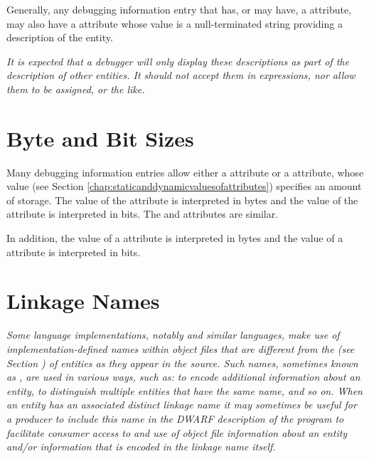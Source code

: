 Generally, any debugging information
entry that 
\hypertarget{chap:DWATdescriptionartificialnameordescription}{}
has, or may have, 
a 
\DWATname{} attribute, may
also have 
a 
\DWATdescription{} attribute whose value is a
null-terminated string providing a description of the entity.


\textit{It is expected that a debugger will only display these
descriptions as part of the description of other entities. It
should not accept them in expressions, nor allow them to be
assigned, or the like.}

\section{Byte and Bit Sizes}
\label{chap:byteandbitsizes}
Many debugging information entries allow either a
\DWATbytesize{} attribute or a 
\DWATbitsize{} attribute,
whose  value 
(see Section \ref{chap:staticanddynamicvaluesofattributes}) 
specifies an
amount of storage. The value of the 
\DWATbytesize{} attribute
is interpreted in bytes and the value of the 
\DWATbitsize{}
attribute is interpreted in bits. The
\DWATstringlengthbytesize{} and 
\DWATstringlengthbitsize{} 
attributes are similar.

In addition, the 
value of a \DWATbytestride{} attribute is interpreted
in bytes and the  value of a 
\DWATbitstride{}
attribute is interpreted in bits.

\section{Linkage Names}
\label{chap:linkagenames}
\textit{Some language implementations, notably 
 and similar
languages, make use of implementation-defined names within
object files that are different from the 
(see Section ) of entities as they 
appear in the source. Such names, sometimes known as 
,
are used in various ways, such as: to encode additional
information about an entity, to distinguish multiple entities
that have the same name, and so on. When an entity has an
associated distinct linkage name it may sometimes be useful
for a producer to include this name in the DWARF description
of the program to facilitate consumer access to and use of
object file information about an entity and/or information
\hypertarget{chap:DWATlinkagenameobjectfilelinkagenameofanentity}{}
that is encoded in the linkage name itself.  
}


